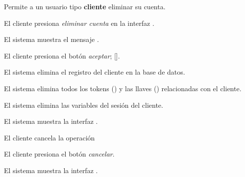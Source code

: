 %
%

{
  Permite a un usuario tipo \textbf{cliente} eliminar su cuenta.

  \begin{trayectoriaPrincipal}

    \item El cliente presiona \textit{eliminar cuenta} en la
      interfaz .

    \item El sistema muestra el mensaje .

    \item El cliente presiona el botón \textit{aceptar};
      [].

    \item El sistema elimina el registro del cliente en la base de datos.

    \item El sistema elimina todos los tokens ()
      y las llaves () relacionadas con el
      cliente.

    \item El sistema elimina las variables del sesión del cliente.

    \item El sistema muestra la interfaz .

  \end{trayectoriaPrincipal}


  \begin{trayectoriaAlternativa}[ta:cancelar]
    {El cliente cancela la operación}

    \item El cliente presiona el botón \textit{cancelar}.

    \item El sistema muestra la interfaz
      .

  \end{trayectoriaAlternativa}
}

